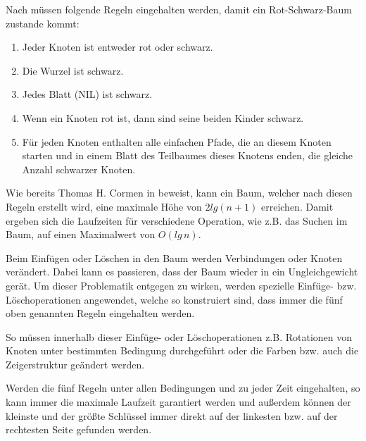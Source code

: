  
Nach \cite{tcormen} müssen folgende Regeln eingehalten werden, damit ein Rot-Schwarz-Baum zustande kommt:

\begin{enumerate}
	\item Jeder Knoten ist entweder rot oder schwarz.
	\item Die Wurzel ist schwarz.
	\item Jedes Blatt (NIL) ist schwarz.
	\item Wenn ein Knoten rot ist, dann sind seine beiden Kinder schwarz.
	\item Für jeden Knoten enthalten alle einfachen Pfade, die an diesem Knoten starten und in einem Blatt des Teilbaumes dieses Knotens enden, die gleiche Anzahl schwarzer Knoten. 
\end{enumerate}

Wie bereits Thomas H. Cormen in \cite{tcormen} beweist, kann ein Baum, welcher nach diesen Regeln erstellt wird, eine maximale Höhe von $2lg(n+1)$ erreichen. Damit ergeben sich die Laufzeiten für verschiedene Operation, wie z.B. das Suchen im Baum, auf einen Maximalwert von $O(lg\, n)$.

Beim Einfügen oder Löschen in den Baum werden Verbindungen oder Knoten verändert. Dabei kann es passieren, dass der Baum wieder in ein Ungleichgewicht gerät. 
Um dieser Problematik entgegen zu wirken, werden spezielle Einfüge- bzw. Lösch\-operationen angewendet, welche so konstruiert sind, dass immer die fünf oben genannten Regeln eingehalten werden. 

So müssen innerhalb dieser Einfüge- oder Lösch\-ope\-ra\-ti\-on\-en z.B. Rotationen von Knoten unter bestimmten Bedingung durchgeführt oder die Farben bzw. auch die Zeigerstruktur geändert werden.

Werden die fünf Regeln unter allen Bedingungen und zu jeder Zeit eingehalten, so kann immer die maximale Laufzeit garantiert werden und außerdem können der kleinste und der größte Schlüssel immer direkt auf der linkesten bzw. auf der rechtesten Seite gefunden werden.

